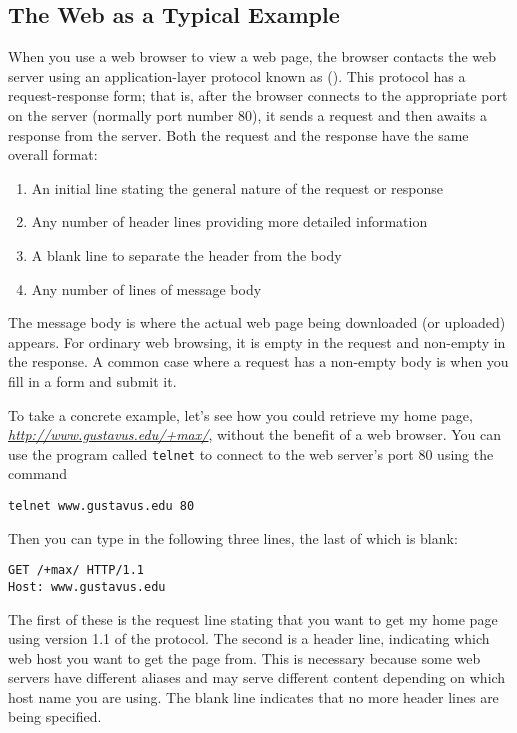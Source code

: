 \subsection{The Web as a Typical Example}\label{http-section}

When you use a web browser to view a web page, the browser contacts the web
server using an application-layer protocol known as 
().  This protocol has a
request-response form; that is, after the browser connects to the
appropriate port on the server (normally port number 80), it sends a
request and then awaits a response from the server.  Both the request
and the response have the same overall format:
\begin{enumerate}
\item An initial line stating
the general nature of the request or response
\item Any number of header
lines providing more detailed information
\item A blank line to separate the header from the body
\item Any
number of lines of message body
\end{enumerate}
The message body is where the actual web page being downloaded (or
uploaded) appears.  For ordinary web browsing, it is empty in the request and
non-empty in the response.  A common case where a request has a
non-empty body is when you fill in a form and submit it.

To take a concrete example, let's see how you could retrieve my home
page, \textit{\url{http://www.gustavus.edu/+max/}}, without the benefit of a web
browser.  You can use the program called \verb|telnet| to connect to the
web server's port 80 using the command
\begin{verbatim}
telnet www.gustavus.edu 80
\end{verbatim}
Then you can type in the following three lines, the last of which is blank:
\begin{verbatim}
GET /+max/ HTTP/1.1
Host: www.gustavus.edu

\end{verbatim}
The first of these is the request line stating that you want to get my
home page using version 1.1 of the protocol.  The second is a header
line, indicating which web host you want to get the page from.  This
is necessary because some web servers have different aliases and may
serve different content depending on which host name you are using.
The blank line indicates that no more header lines are being
specified.

